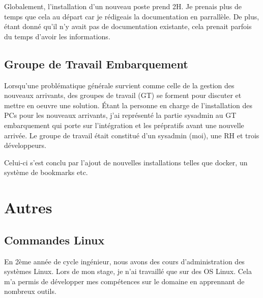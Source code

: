 \documentclass[12pt]{article}
\begin{document}
Globalement, l'installation d'un nouveau poste prend 2H. 
Je prenais plus de temps que cela au départ car je rédigeais la documentation en parrallèle. 
De plus, étant donné qu'il n'y avait pas de documentation existante, cela prenait parfois du temps d'avoir les informations. 

\subsection{Groupe de Travail Embarquement}
Lorsqu'une problématique générale survient comme celle de la gestion des nouveaux arrivants, des groupes de travail (GT) se forment pour discuter et mettre en oeuvre une solution.
Étant la personne en charge de l'installation des PCs pour les nouveaux arrivants, j'ai représenté la partie sysadmin au GT embarquement qui porte sur l'intégration et les prépratifs avant une nouvelle arrivée.
Le groupe de travail était constitué d'un sysadmin (moi), une RH et trois développeurs.

Celui-ci s'est conclu par l'ajout de nouvelles installations telles que docker, un système de bookmarks etc.
\newpage
\section{Autres}
\subsection{Commandes Linux}
En 2ème année de cycle ingénieur, nous avons des cours d'administration des systèmes \gls{Linux}.
Lors de mon stage, je n'ai travaillé que sur des OS \gls{Linux}.
Cela m'a permis de développer mes compétences sur le domaine en apprennant de nombreux outils.
\end{document}
